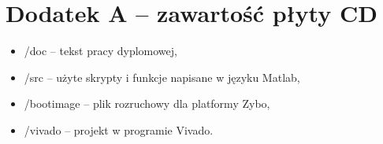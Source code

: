 \chapter{Dodatek A -- zawartość płyty CD}
\begin{itemize}
\item /doc -- tekst pracy dyplomowej,
\item /src -- użyte skrypty i funkcje napisane w języku Matlab,
\item /bootimage -- plik rozruchowy dla platformy Zybo,
\item /vivado -- projekt w programie Vivado.
\end{itemize}








